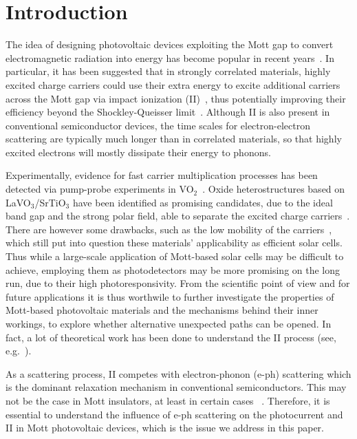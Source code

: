 \documentclass[aps,prb,groupedaddress,showpacs,twocolumn,superscriptaddress,10pt]{revtex4-2}
\begin{document}
\maketitle   
 

\section{Introduction} 
\label{sec:intro}

The idea of designing photovoltaic devices exploiting the Mott gap to convert electromagnetic radiation into energy has become popular in recent years~\cite{mano.10,li.ch.13,gu.gu.13,co.ma.14,wa.li.15}. In particular, it has been suggested that in strongly correlated materials, highly excited charge carriers could use their extra energy to excite additional carriers across the Mott gap via impact ionization (II)~\cite{mano.10,co.ma.14}, thus
potentially improving their efficiency beyond the Shockley-Queisser limit~\cite{sh.qu.61}. Although II is also present in conventional semiconductor devices, the time scales for electron-electron scattering are typically much longer than in correlated materials, so that highly excited electrons will mostly dissipate their energy to phonons. 

Experimentally, evidence for fast carrier multiplication processes has been detected via pump-probe experiments in VO$_2$~\cite{ho.bi.16}. Oxide heterostructures based on LaVO$_3$/SrTiO$_3$ have been identified as promising candidates, due to the ideal band gap and the strong polar field, able to separate the excited charge carriers~\cite{as.bl.13}. There are however some drawbacks, such as the low mobility of the carriers~\cite{wa.li.15,je.re.18}, which still put into question these materials’ applicability as efficient solar cells. Thus while a large-scale application of Mott-based solar cells may be difficult to achieve, employing them as photodetectors may be more promising on the long run, due to their high photoresponsivity. From the scientific point of view and for future applications it is thus worthwile to further investigate the properties of Mott-based photovoltaic materials and the mechanisms behind their inner workings, to explore whether alternative unexpected paths can be opened. In fact, a lot of theoretical work has been done to understand the II process (see, e.g.~\cite{co.ma.14,ec.we.11,ec.we.13,we.he.14,pe.be.19,so.do.18,ka.wo.20,ma.ev.22}).

As a scattering process, II competes with electron-phonon (e-ph) scattering which is the dominant relaxation mechanism in conventional semiconductors. This may not be the case in Mott insulators, at least in certain cases ~\cite{co.ma.14}. Therefore, it is essential to understand the influence of e-ph scattering on the photocurrent and II in Mott photovoltaic devices, which is the issue we address in this paper.
\end{document}
